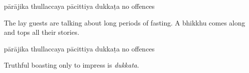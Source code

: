 \begin{exam}{\autoExamName}
\begin{problem*}
\begin{parts}
  \bigskip

  \begin{answers}{5}
    \bChoices
     pārājika\eAns
     thullaccaya\eAns
     pācittiya\eAns
     dukkaṭa\eAns
     no offences\eAns
    \eChoices
  \end{answers}

  \bigskip

\item The lay guests are talking about long periods of fasting. A bhikkhu comes
  along and tops all their stories.

  \bigskip

  \begin{answers}{5}
    \bChoices
     pārājika\eAns
     thullaccaya\eAns
     pācittiya\eAns
     dukkaṭa\eAns
     no offences\eAns
    \eChoices
  \end{answers}

  \begin{solution}
    Truthful boasting only to impress is \emph{dukkata}.
  \end{solution}

\end{parts}

\end{problem*}

\end{exam}
